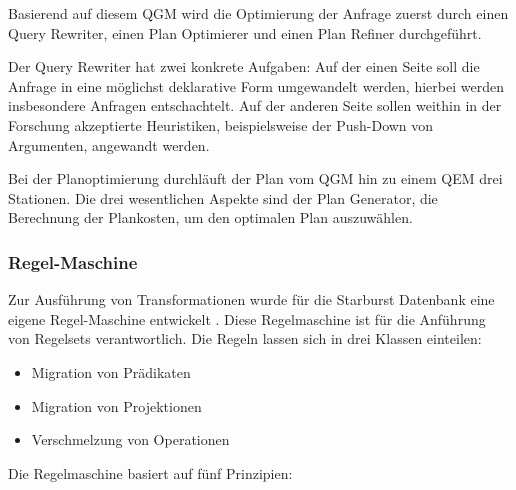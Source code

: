 Basierend auf diesem \ac{QGM} wird die Optimierung der Anfrage zuerst durch einen Query Rewriter, einen Plan Optimierer und einen Plan Refiner durchgeführt.

Der Query Rewriter hat zwei konkrete Aufgaben: Auf der einen Seite soll die Anfrage in eine möglichst deklarative Form umgewandelt werden, hierbei werden insbesondere Anfragen entschachtelt. Auf der anderen Seite sollen weithin in der Forschung akzeptierte Heuristiken, beispielsweise der Push-Down von Argumenten, angewandt werden.


Bei der Planoptimierung durchläuft der Plan vom \ac{QGM} hin zu einem QEM drei Stationen. Die drei wesentlichen Aspekte sind der Plan Generator, die Berechnung der Plankosten, um den optimalen Plan auszuwählen. 

\subsubsection{Regel-Maschine}

Zur Ausführung von Transformationen wurde für die Starburst Datenbank eine eigene Regel-Maschine entwickelt \cite{lohman1988Starbust}. Diese Regelmaschine ist für die Anführung von Regelsets verantwortlich. Die Regeln lassen sich in drei Klassen einteilen:

\begin{itemize}
\item Migration von Prädikaten
\item Migration von Projektionen
\item Verschmelzung von Operationen
\end{itemize}



Die Regelmaschine basiert auf fünf Prinzipien:

